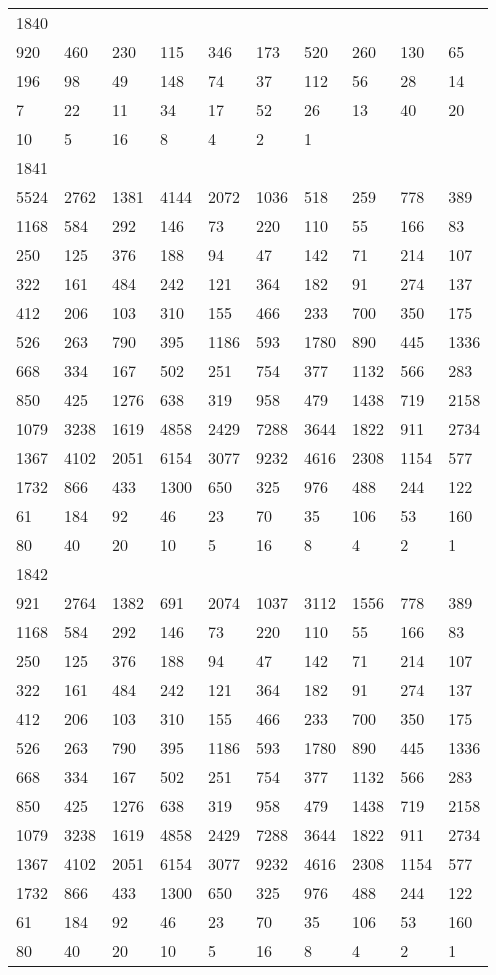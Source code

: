 \begin{longtable}{*{10}{l}}
1840&&&&&&&&&\\
920& 460& 230& 115& 346& 173& 520& 260& 130& 65\\
196& 98& 49& 148& 74& 37& 112& 56& 28& 14\\
7& 22& 11& 34& 17& 52& 26& 13& 40& 20\\
10& 5& 16& 8& 4& 2& 1& \\

1841&&&&&&&&&\\
5524& 2762& 1381& 4144& 2072& 1036& 518& 259& 778& 389\\
1168& 584& 292& 146& 73& 220& 110& 55& 166& 83\\
250& 125& 376& 188& 94& 47& 142& 71& 214& 107\\
322& 161& 484& 242& 121& 364& 182& 91& 274& 137\\
412& 206& 103& 310& 155& 466& 233& 700& 350& 175\\
526& 263& 790& 395& 1186& 593& 1780& 890& 445& 1336\\
668& 334& 167& 502& 251& 754& 377& 1132& 566& 283\\
850& 425& 1276& 638& 319& 958& 479& 1438& 719& 2158\\
1079& 3238& 1619& 4858& 2429& 7288& 3644& 1822& 911& 2734\\
1367& 4102& 2051& 6154& 3077& 9232& 4616& 2308& 1154& 577\\
1732& 866& 433& 1300& 650& 325& 976& 488& 244& 122\\
61& 184& 92& 46& 23& 70& 35& 106& 53& 160\\
80& 40& 20& 10& 5& 16& 8& 4& 2& 1\\

1842&&&&&&&&&\\
921& 2764& 1382& 691& 2074& 1037& 3112& 1556& 778& 389\\
1168& 584& 292& 146& 73& 220& 110& 55& 166& 83\\
250& 125& 376& 188& 94& 47& 142& 71& 214& 107\\
322& 161& 484& 242& 121& 364& 182& 91& 274& 137\\
412& 206& 103& 310& 155& 466& 233& 700& 350& 175\\
526& 263& 790& 395& 1186& 593& 1780& 890& 445& 1336\\
668& 334& 167& 502& 251& 754& 377& 1132& 566& 283\\
850& 425& 1276& 638& 319& 958& 479& 1438& 719& 2158\\
1079& 3238& 1619& 4858& 2429& 7288& 3644& 1822& 911& 2734\\
1367& 4102& 2051& 6154& 3077& 9232& 4616& 2308& 1154& 577\\
1732& 866& 433& 1300& 650& 325& 976& 488& 244& 122\\
61& 184& 92& 46& 23& 70& 35& 106& 53& 160\\
80& 40& 20& 10& 5& 16& 8& 4& 2& 1\\


\end{longtable}
